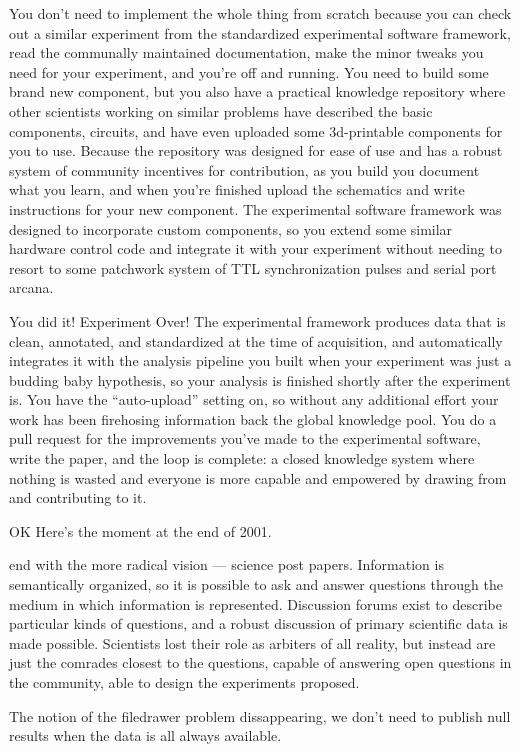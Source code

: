 \documentclass[10pt]{article}
\begin{document}
\begin{multicols}{2}
You don't need to implement the whole thing from scratch because you can
check out a similar experiment from the standardized experimental
software framework, read the communally maintained documentation, make
the minor tweaks you need for your experiment, and you're off and
running. You need to build some brand new component, but you also have a
practical knowledge repository where other scientists working on similar
problems have described the basic components, circuits, and have even
uploaded some 3d-printable components for you to use. Because the
repository was designed for ease of use and has a robust system of
community incentives for contribution, as you build you document what
you learn, and when you're finished upload the schematics and write
instructions for your new component. The experimental software framework
was designed to incorporate custom components, so you extend some
similar hardware control code and integrate it with your experiment
without needing to resort to some patchwork system of TTL
synchronization pulses and serial port arcana.

You did it! Experiment Over! The experimental framework produces data
that is clean, annotated, and standardized at the time of acquisition,
and automatically integrates it with the analysis pipeline you built
when your experiment was just a budding baby hypothesis, so your
analysis is finished shortly after the experiment is. You have the
``auto-upload'' setting on, so without any additional effort your work
has been firehosing information back the global knowledge pool. You do a
pull request for the improvements you've made to the experimental
software, write the paper, and the loop is complete: a closed knowledge
system where nothing is wasted and everyone is more capable and
empowered by drawing from and contributing to it.

OK Here's the moment at the end of 2001.

end with the more radical vision --- science post papers. Information is
semantically organized, so it is possible to ask and answer questions
through the medium in which information is represented. Discussion
forums exist to describe particular kinds of questions, and a robust
discussion of primary scientific data is made possible. Scientists lost
their role as arbiters of all reality, but instead are just the comrades
closest to the questions, capable of answering open questions in the
community, able to design the experiments proposed.

The notion of the filedrawer problem dissappearing, we don't need to
publish null results when the data is all always available.


\end{multicols}
\end{document}
